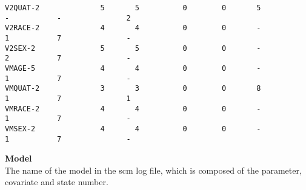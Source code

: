 \documentclass[hideglossary,notoc,hidelof,hidelot,hideTheSignaturePage,hideLinkCurrent,hideloa,pdfLatex,noClient,notitle,hideConfidential]{PMXstyle-20190820}
\begin{document}
{\begin{verbatim}
V2QUAT-2              5       5          0        0       5           -           -               2
V2RACE-2              4       4          0        0       -           1           7               -
V2SEX-2               5       5          0        0       -           2           7               -
VMAGE-5               4       4          0        0       -           1           7               -
VMQUAT-2              3       3          0        0       8           1           7               1
VMRACE-2              4       4          0        0       -           1           7               -
VMSEX-2               4       4          0        0       -           1           7               -
\end{verbatim}
}


{\bfseries Model}\\
The name of the model in the scm log file, which is composed of the parameter, covariate and state number.


\end{document}
